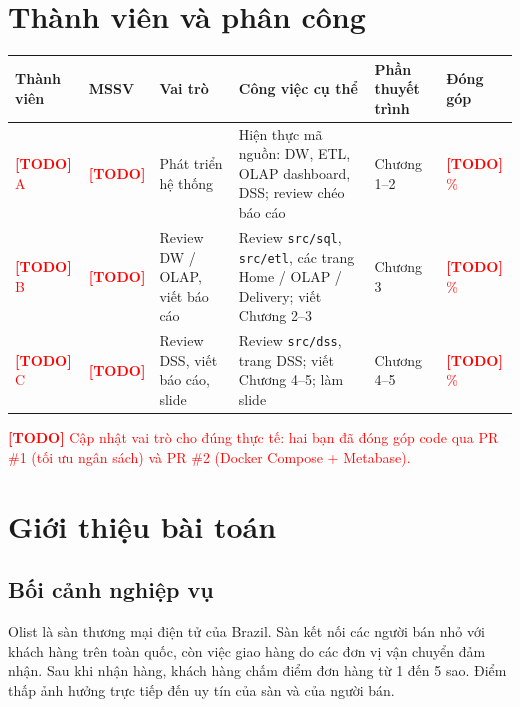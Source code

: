 \documentclass[12pt,a4paper]{report}
\newcommand{\todo}[1]{\textcolor{red}{\textbf{[TODO]} #1}}
\newcommand{\code}[1]{\texttt{#1}}
\renewcommand{\_}{\oldunderscore\allowbreak}
\begin{document}
\tableofcontents
\clearpage

\chapter*{Thành viên và phân công}

\begin{table}[H]
\centering\small
\begin{tabular}{L{2.2cm}L{1.6cm}L{2.4cm}L{3.1cm}L{2.2cm}L{1.7cm}}
\toprule
Thành viên & MSSV & Vai trò & Công việc cụ thể & Phần thuyết trình & Đóng góp \\
\midrule
\todo{A} & \todo{} & Phát triển hệ thống & Hiện thực mã nguồn: DW, ETL, OLAP dashboard, DSS; review chéo báo cáo & Chương 1--2 & \todo{\%} \\
\todo{B} & \todo{} & Review DW / OLAP, viết báo cáo & Review \code{src/sql}, \code{src/etl}, các trang Home / OLAP / Delivery; viết Chương 2--3 & Chương 3 & \todo{\%} \\
\todo{C} & \todo{} & Review DSS, viết báo cáo, slide & Review \code{src/dss}, trang DSS; viết Chương 4--5; làm slide & Chương 4--5 & \todo{\%} \\
\bottomrule
\end{tabular}
\end{table}

\todo{Cập nhật vai trò cho đúng thực tế: hai bạn đã đóng góp code qua PR \#1 (tối ưu ngân sách) và PR \#2 (Docker Compose + Metabase).}

\chapter{Giới thiệu bài toán}\label{ch:intro}

\section{Bối cảnh nghiệp vụ}

Olist là sàn thương mại điện tử của Brazil. Sàn kết nối các người bán nhỏ với khách hàng trên toàn quốc, còn việc giao hàng do các đơn vị vận chuyển đảm nhận. Sau khi nhận hàng, khách hàng chấm điểm đơn hàng từ 1 đến 5 sao. Điểm thấp ảnh hưởng trực tiếp đến uy tín của sàn và của người bán.
\end{document}
